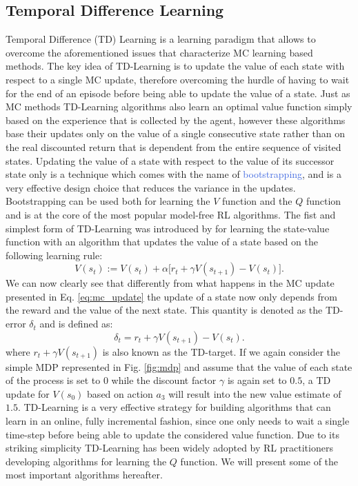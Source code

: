 \subsection{Temporal Difference Learning}
\label{sec:td_learning}
Temporal Difference (TD) Learning \cite{sutton1984temporal,sutton1988learning} is a learning paradigm that allows to overcome the aforementioned issues that characterize MC learning based methods. The key idea of TD-Learning is to update the value of each state with respect to a single MC update, therefore overcoming the hurdle of having to wait for the end of an episode before being able to update the value of a state. Just as MC methods TD-Learning algorithms also learn an optimal value function simply based on the experience that is collected by the agent, however these algorithms base their updates only on the value of a single consecutive state rather than on the real discounted return that is dependent from the entire sequence of visited states. Updating the value of a state with respect to the value of its successor state only is a technique which comes with the name of \textcolor{RoyalBlue}{bootstrapping}, and is a very effective design choice that reduces the variance in the updates. Bootstrapping can be used both for learning the $V$ function and the $Q$ function and is at the core of the most popular model-free RL algorithms. The fist and simplest form of TD-Learning was introduced by \citet{sutton1988learning} for learning the state-value function with an algorithm that updates the value of a state based on the following learning rule:
\begin{equation}
	V(s_t):= V(s_t) + \alpha \big[r_t + \gamma V(s_{t+1}) - V(s_t)\big].
	\label{eq:td_learning_v}
\end{equation}
We can now clearly see that differently from what happens in the MC update presented in Eq. \ref{eq:mc_update} the update of a state now only depends from the reward and the value of the next state. This quantity is denoted as the TD-error $\delta_t$ and is defined as:
\begin{equation}
	\delta_t = r_t + \gamma V(s_{t+1}) - V(s_t).
\end{equation}
where $r_t + \gamma V(s_{t+1})$ is also known as the TD-target.
If we again consider the simple MDP represented in Fig. \ref{fig:mdp} and assume that the value of each state of the process is set to $0$ while the discount factor $\gamma$ is again set to $0.5$, a TD update for $V(s_0)$ based on action $a_3$ will result into the new value estimate of $1.5$. 
TD-Learning is a very effective strategy for building algorithms that can learn in an online, fully incremental fashion, since one only needs to wait a single time-step before being able to update the considered value function. Due to its striking simplicity TD-Learning has been widely adopted by RL practitioners developing algorithms for learning the $Q$ function. We will present some of the most important algorithms hereafter. 

